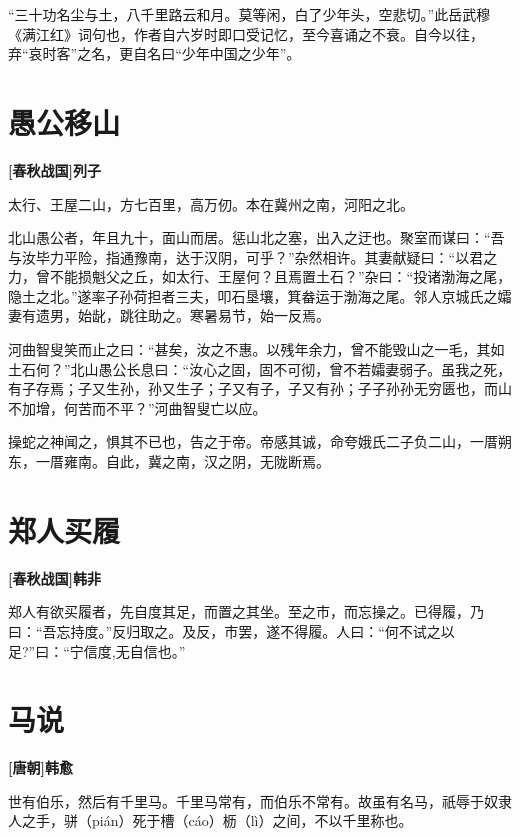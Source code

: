 \documentclass[UTF8,titlepage,oneside]{ctexbook}
\begin{document}
“三十功名尘与土，八千里路云和月。莫等闲，白了少年头，空悲切。”此岳武穆《满江红》词句也，作者自六岁时即口受记忆，至今喜诵之不衰。自今以往，弃“哀时客”之名，更自名曰“少年中国之少年”。


\chapter*{愚公移山}
\begin{center}
	\textbf{[春秋战国]列子}
\end{center}

太行、王屋二山，方七百里，高万仞。本在冀州之南，河阳之北。

北山愚公者，年且九十，面山而居。惩山北之塞，出入之迂也。聚室而谋曰：“吾与汝毕力平险，指通豫南，达于汉阴，可乎？”杂然相许。其妻献疑曰：“以君之力，曾不能损魁父之丘，如太行、王屋何？且焉置土石？”杂曰：“投诸渤海之尾，隐土之北。”遂率子孙荷担者三夫，叩石垦壤，箕畚运于渤海之尾。邻人京城氏之孀妻有遗男，始龀，跳往助之。寒暑易节，始一反焉。

河曲智叟笑而止之曰：“甚矣，汝之不惠。以残年余力，曾不能毁山之一毛，其如土石何？”北山愚公长息曰：“汝心之固，固不可彻，曾不若孀妻弱子。虽我之死，有子存焉；子又生孙，孙又生子；子又有子，子又有孙；子子孙孙无穷匮也，而山不加增，何苦而不平？”河曲智叟亡以应。

操蛇之神闻之，惧其不已也，告之于帝。帝感其诚，命夸娥氏二子负二山，一厝朔东，一厝雍南。自此，冀之南，汉之阴，无陇断焉。


\chapter*{郑人买履}
\begin{center}
	\textbf{[春秋战国]韩非}
\end{center}

郑人有欲买履者，先自度其足，而置之其坐。至之市，而忘操之。已得履，乃曰：“吾忘持度。”反归取之。及反，市罢，遂不得履。人曰：“何不试之以足?”曰：“宁信度,无自信也。”


\chapter*{马说}
\begin{center}
	\textbf{[唐朝]韩愈}
\end{center}

世有伯乐，然后有千里马。千里马常有，而伯乐不常有。故虽有名马，祇辱于奴隶人之手，骈（pián）死于槽（cáo）枥（lì）之间，不以千里称也。
\end{document}
